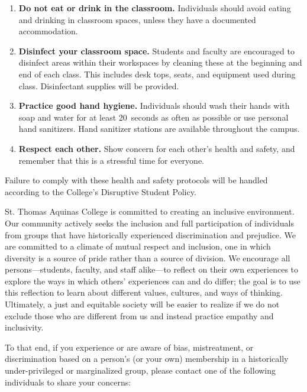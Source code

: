 \documentclass[11pt,letterpaper]{article}
\begin{document}
\begin{enumerate}[1.]
\item {\bfseries Do not eat or drink in the classroom.} Individuals should avoid eating and drinking in classroom spaces, unless they have a documented accommodation.

\item {\bfseries Disinfect your classroom space.} Students and faculty are encouraged to disinfect areas within their workspaces by cleaning these at the beginning and end of each class. This includes desk tops, seats, and equipment used during class. Disinfectant supplies will be provided. 

\item {\bfseries Practice good hand hygiene.} Individuals should wash their hands with soap and water for at least 20~seconds as often as possible or use personal hand sanitizers. Hand sanitizer stations are available throughout the campus.

\item {\bfseries Respect each other.} Show concern for each other’s health and safety, and remember that this is a stressful time for everyone.
\end{enumerate}

Failure to comply with these health and safety protocols will be handled according to the College's Disruptive Student Policy.
\sectionbreak




St. Thomas Aquinas College is committed to creating an inclusive environment. Our community actively seeks the inclusion and full participation of individuals from groups that have historically experienced discrimination and prejudice. We are committed to a climate of mutual respect and inclusion, one in which diversity is a source of pride rather than a source of division. We encourage all persons---students, faculty, and staff alike---to reflect on their own experiences to explore the ways in which others' experiences can and do differ; the goal is to use this reflection to learn about different values, cultures, and ways of thinking. Ultimately, a just and equitable society will be easier to realize if we do not exclude those who are different from us and instead practice empathy and inclusivity.  \pspace

To that end, if you experience or are aware of bias, mistreatment, or discrimination based on a person's (or your own) membership in a historically under-privileged or marginalized group, please contact one of the following individuals to share your concerns: \pspace
\end{document}
